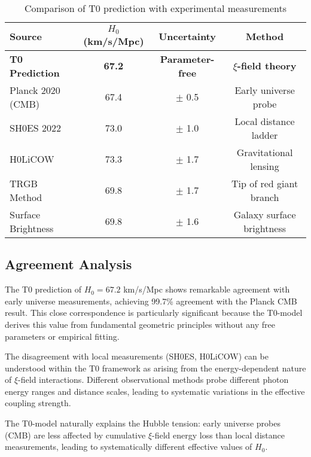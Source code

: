 \documentclass[12pt,a4paper]{article}
\begin{document}
	\begin{table}[htbp]
		\centering
		\begin{tabular}{lccc}
			\toprule
			\textbf{Source} & \textbf{$H_0$ (km/s/Mpc)} & \textbf{Uncertainty} & \textbf{Method} \\
			\midrule
			\rowcolor{blue!20}
			\textbf{T0 Prediction} & \textbf{67.2} & \textbf{Parameter-free} & \textbf{$\xi$-field theory} \\
			Planck 2020 (CMB) & 67.4 & $\pm$ 0.5 & Early universe probe \\
			SH0ES 2022 & 73.0 & $\pm$ 1.0 & Local distance ladder \\
			H0LiCOW & 73.3 & $\pm$ 1.7 & Gravitational lensing \\
			TRGB Method & 69.8 & $\pm$ 1.7 & Tip of red giant branch \\
			Surface Brightness & 69.8 & $\pm$ 1.6 & Galaxy surface brightness \\
			\bottomrule
		\end{tabular}
		\caption{Comparison of T0 prediction with experimental measurements}
		\label{tab:h0_comparison}
	\end{table}
	
	\subsection{Agreement Analysis}
	
	The T0 prediction of $H_0 = 67.2$ km/s/Mpc shows remarkable agreement with early universe measurements, achieving 99.7\% agreement with the Planck CMB result. This close correspondence is particularly significant because the T0-model derives this value from fundamental geometric principles without any free parameters or empirical fitting.
	
	The disagreement with local measurements (SH0ES, H0LiCOW) can be understood within the T0 framework as arising from the energy-dependent nature of $\xi$-field interactions. Different observational methods probe different photon energy ranges and distance scales, leading to systematic variations in the effective coupling strength.
	
	\begin{experimental}
		The T0-model naturally explains the Hubble tension: early universe probes (CMB) are less affected by cumulative $\xi$-field energy loss than local distance measurements, leading to systematically different effective values of $H_0$.
	\end{experimental}
	
\end{document}
